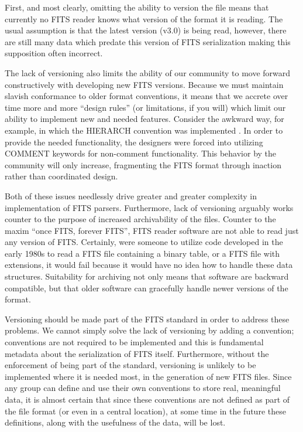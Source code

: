 \documentclass[final,authoryear,5p,times,twocolumn]{elsarticle}
\begin{document}
First, and most clearly, omitting the ability to version the file
means that currently no FITS reader knows what version of the format
it is reading. The usual assumption is that the latest version (v3.0)
is being read, however, there are still many data which predate this
version of FITS serialization making this supposition often incorrect.


The lack of versioning also limits the ability of our community to
move forward constructively with developing new FITS versions. Because
we must maintain slavish conformance to older format conventions, it
means that we accrete over time more and more ``design rules'' (or
limitations, if you will) which limit our ability to implement new and
needed features. Consider the awkward way, for example, in which the
HIERARCH convention was implemented \citep{2009Wic}.
In order to provide the needed functionality, the designers
were forced into utilizing COMMENT keywords for non-comment
functionality. This behavior by the community will only increase,
fragmenting the FITS format through inaction rather than coordinated
design.


Both of these issues needlessly drive greater and greater complexity
in implementation of FITS parsers. Furthermore, lack of versioning
arguably works counter to the purpose of increased archivability of
the files. Counter to the maxim ``once FITS, forever FITS'', FITS reader
software are not able to read just any version of FITS. Certainly,
were someone to utilize code developed in the early 1980s to read a
FITS file containing a binary table, or a FITS file with extensions,
it would fail because it would have no idea how to handle these data
structures. Suitability for archiving not only means that software are
backward compatible, but that older software can gracefully handle
newer versions of the format.


Versioning should be made part of the FITS standard in order to
address these problems. We cannot simply solve the lack of versioning
by adding a convention; conventions are not required to be implemented
and this is fundamental metadata about the serialization of FITS
itself. Furthermore, without the enforcement of being part of the
standard, versioning is unlikely to be implemented where it is needed
most, in the generation of new FITS files. Since any group can define
and use their own conventions to store real, meaningful data, it is
almost certain that since these conventions are not defined as part of
the file format (or even in a central location), at some time in the
future these definitions, along with the usefulness of the data, will
be lost.
\end{document}
